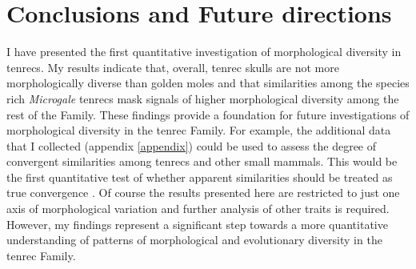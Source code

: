 \section{Conclusions and Future directions}
\label{sect:concl}

	I have presented the first quantitative investigation of morphological diversity in tenrecs. My results indicate that, overall, tenrec skulls are not more morphologically diverse than golden moles and that similarities among the species rich \textit{Microgale} tenrecs mask signals of higher morphological diversity among the rest of the Family. These findings provide a foundation for future investigations of morphological diversity in the tenrec Family. For example, the additional data that I collected (appendix \ref{appendix}) could be used to assess the degree of convergent similarities among tenrecs and other small mammals. This would be the first quantitative test of whether apparent similarities \citep{Olson2013, Soarimalala2011, Eisenberg1969} should be treated as true convergence \citep[e.g.][]{Losos2011, Stayton2008}.
	Of course the results presented here are restricted to just one axis of morphological variation and further analysis of other traits is required. However, my findings represent a significant step towards a more quantitative understanding of patterns of morphological and evolutionary diversity in the tenrec Family. 






